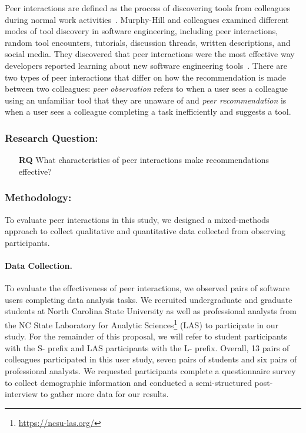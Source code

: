 Peer interactions are defined as the process of discovering tools from colleagues during normal work activities~\cite{Murphy-Hill2011PeerInteraction}. Murphy-Hill and colleagues examined different modes of tool discovery in software engineering, including peer interactions, random tool encounters, tutorials, discussion threads, written descriptions, and social media. They discovered that peer interactions were the most effective way developers reported learning about new software engineering tools~\cite{Murphy-Hill2015HowDoUsers,Murphy-Hill2011PeerInteraction}. There are two types of peer interactions that differ on how the recommendation is made between two colleagues: \textit{peer observation} refers to when a user sees a colleague using an unfamiliar tool that they are unaware of and \textit{peer recommendation} is when a user sees a colleague completing a task inefficiently and suggests a tool.

\subsubsection{Research Question:}

\begin{itemize}
  \item[\textbf{RQ}] What characteristics of peer interactions make recommendations effective?
\end{itemize}

\subsubsection{Methodology:}

To evaluate peer interactions in this study, we designed a mixed-methods approach to collect qualitative and quantitative data collected from observing participants.

\paragraph{Data Collection.} To evaluate the effectiveness of peer interactions, we observed pairs of software users completing data analysis tasks. We recruited undergraduate and graduate students at North Carolina State University as well as professional analysts from the NC State Laboratory for Analytic Sciences\footnote{\url{https://ncsu-las.org/}} (LAS) to participate in our study. For the remainder of this proposal, we will refer to student participants with the S- prefix and LAS participants with the L- prefix. Overall, 13 pairs of colleagues participated in this user study, seven pairs of students and six pairs of professional analysts. We requested participants complete a questionnaire survey to collect demographic information and conducted a semi-structured post-interview to gather more data for our results. 

